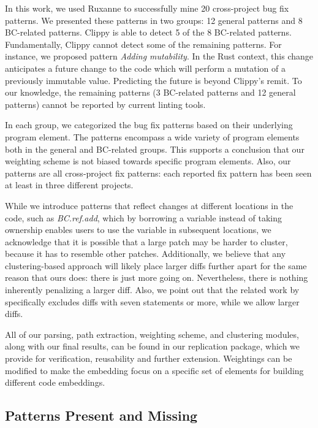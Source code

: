 In this work, we used Ruxanne to successfully mine 20 cross-project bug fix patterns. We presented these patterns in two groups: 12 general patterns and 8 BC-related patterns. Clippy is able to detect 5 of the 8 BC-related patterns. Fundamentally, Clippy cannot detect some of the remaining patterns. For instance, we proposed pattern \textit{Adding mutability}. In the Rust context, this change anticipates a future change to the code which will perform a mutation of a previously immutable value. Predicting the future is beyond Clippy's remit. To our knowledge, the remaining patterns (3 BC-related patterns and 12 general patterns) cannot be reported by current linting tools. 

In each group, we categorized the bug fix patterns based on their underlying program element. The patterns encompass a wide variety of program elements both in the general and BC-related groups. This supports a conclusion that our weighting scheme is not biased towards specific program elements. Also, our patterns are all cross-project fix patterns: each reported fix pattern has been seen at least in three different projects.

While we introduce patterns that reflect changes at different locations in the code, such as \textit{BC.ref.add}, which by borrowing a variable instead of taking ownership enables users to use the variable in subsequent locations, we acknowledge that it is possible that a large patch may be harder to cluster, because it has to resemble other patches. Additionally, we believe that any clustering-based approach will likely place larger diffs further apart for the same reason that ours does: there is just more going on. Nevertheless, there is nothing inherently penalizing a larger diff. Also, we point out that the related work by~\cite{pan2009toward} specifically excludes diffs with seven statements or more, while we allow larger diffs.

All of our parsing, path extraction, weighting scheme, and clustering modules, along with our final results, can be found in our replication package, which we provide for verification, reusability and further extension. Weightings can be modified to make the embedding focus on a specific set of elements for building different code embeddings.

\subsection{Patterns Present and Missing}
\label{subsec:patterns}

